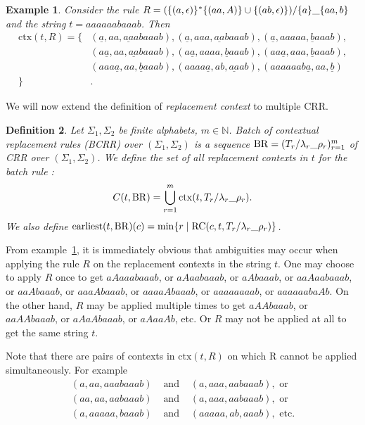 \documentclass{article}
\newtheorem{definition}{Definition}[section]
\newtheorem{example}[definition]{Example}
\begin{document}
	\begin{example} \label{ex:context}
		Consider the rule \( R=\crr[(\{(a,\epsilon)\}^*\{(aa,A)\}\cup \{(ab, \epsilon)\})][\{a\}][\{aa, b\}] \) and the string $t=aaaaaabaaab$.
		Then
		\begin{align*}
			\mathrm{ctx}(t, R) = \{&(\underline{a}, aa, \underline{aa}abaaab), (\underline{a}, aaa, \underline{aa}baaab), (\underline{a}, aaaaa, \underline{b}aaab), \\
				 				   &(a\underline{a}, aa, \underline{aa}baaab), (a\underline{a}, aaaa, \underline{b}aaab), (aa\underline{a}, aaa, \underline{b}aaab), \\
				 				   &(aaa\underline{a}, aa, \underline{b}aaab), (aaaa\underline{a}, ab, \underline{aa}ab), (aaaaaab\underline{a}, aa, \underline{b})  \\
						         \}&. \nonumber
		\end{align*}
	\end{example}
	
	We will now extend the definition of \emph{replacement context} to multiple CRR.

	\begin{definition} \label{def:bcrr}
		Let $\Sigma_1, \Sigma_2$ be finite alphabets, $m \in \mathbb{N}$. %
		Batch of contextual replacement rules (BCRR) over $(\Sigma_1, \Sigma_2)$ is a sequence $\mathrm{BR}=\bcrr{m}$ of CRR over $(\Sigma_1, \Sigma_2)$.
		We define the set of all replacement contexts in $t$ for the batch rule :
		\[ C(t, \mathrm{BR}) = \bigcup_{r=1}^m \mathrm{ctx}(t, \crr[T_r][\lambda_r][\rho_r]). \]
		We also define $\mathrm{earliest}(t, \mathrm{BR})(c) = \min\{r \mid \mathrm{RC}(c, t, \crr[T_r][\lambda_r][\rho_r]) \}$.
	\end{definition}

	From example~\ref{ex:context}, it is immediately obvious that ambiguities may occur when applying the rule $R$ on the replacement contexts in the string $t$.
	One may choose to apply $R$ once to get $aAaaabaaab$, or $aAaabaaab$, or $aAbaaab$, or $aaAaabaaab$, or $aaAbaaab$, or $aaaAbaaab$, or $aaaaAbaaab$, or $aaaaaaaab$, or $aaaaaabaAb$.
	On the other hand, $R$ may be applied multiple times to get $aAAbaaab$, or $aaAAbaaab$, or $aAaAbaaab$, or $aAaaAb$, etc.
	Or $R$ may not be applied at all to get the same string $t$.

	Note that there are pairs of contexts in $\mathrm{ctx}(t, R)$ on which R cannot be applied simultaneously. For example
	\begin{eqnarray*}
		(a, aa, aaabaaab) &\text{ and }& (a, aaa, aabaaab), \text{ or} \\ 
		(aa, aa, aabaaab) &\text{ and }& (a, aaa, aabaaab), \text{ or} \\
		(a, aaaaa, baaab) &\text{ and }& (aaaaa, ab, aaab), \text{ etc.}
	\end{eqnarray*}
\end{document}
